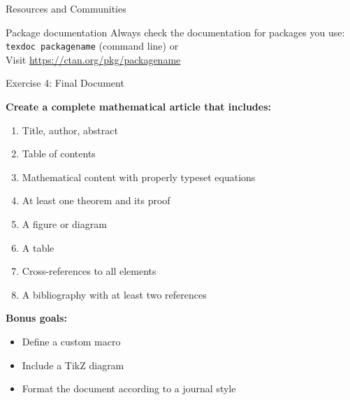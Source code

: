 \begin{frame}{Resources and Communities}
          \begin{block}{Package documentation}
               Always check the documentation for packages you use:\\
               \texttt{texdoc packagename} (command line) or\\
               Visit \url{https://ctan.org/pkg/packagename}
          \end{block}
     \end{frame}
     
     \begin{frame}{Exercise 4: Final Document}
          \begin{practice}
               \textbf{Create a complete mathematical article that includes:}
               \begin{enumerate}
                    \item Title, author, abstract
                    \item Table of contents
                    \item Mathematical content with properly typeset equations
                    \item At least one theorem and its proof
                    \item A figure or diagram
                    \item A table
                    \item Cross-references to all elements
                    \item A bibliography with at least two references
               \end{enumerate}
          \end{practice}
          
          \textbf{Bonus goals:}
          \begin{itemize}
               \item Define a custom macro
               \item Include a TikZ diagram
               \item Format the document according to a journal style
          \end{itemize}
     \end{frame}
     
